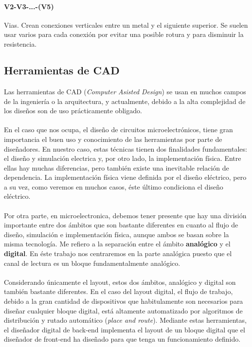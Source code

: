 \paragraph{V2-V3-...-(V5)} Vias. Crean conexiones verticales entre un metal y el
siguiente superior. Se suelen usar varios para cada conexión por evitar una
posible rotura y para disminuir la resistencia.

\subsection{Herramientas de CAD}

\paragraph{} Las herramientas de CAD (\textit{Computer Asisted Design}) se usan
en muchos campos de la ingeniería o la arquitectura, y actualmente, debido a la alta
complejidad de los diseños son de uso prácticamente obligado.

\paragraph{} En el caso que nos ocupa, el diseño de circuitos microelectrónicos,
tiene gran importancia el buen uso y conocimiento de las herramientas por parte de
diseñadores. En nuestro caso, estas técnicas tienen dos finalidades fundamentales:
el diseño y simulación electrica y, por otro lado, la implementación física. Entre ellas
hay muchas diferencias, pero también existe una inevitable relación de dependencia.
La implementación física viene definida por el diseño eléctrico, pero a su vez, como
veremos en muchos casos, éste último condiciona el diseño eléctrico.

\paragraph{} Por otra parte, en microelectronica, debemos tener presente que
hay una división importante entre dos ámbitos que son bastante diferentes en cuanto
al flujo de diseño, simulación e implementación física, aunque ambos se basan sobre
la misma tecnología. Me refiero a la separación entre el ámbito \textbf{analógico}
y el \textbf{digital}. En éste trabajo nos centraremos en la parte analógica
puesto que el canal de lectura es un bloque fundamentalmente analógico.

\paragraph{} Considerando únicamente el layout, estos dos ámbitos, analógico y
digital son también bastante diferentes. En el caso del layout digital, el flujo
de trabajo, debido a la gran cantidad de dispositivos que habitulamente son necesarios
para diseñar cualquier bloque digital, está altamente automatizado por algoritmos
de distribución y rutado automático (\textit{place and route}). Mediante estas
herramientas, el diseñador digital de back-end implementa el layout de un bloque
digital que el diseñador de front-end ha diseñado para que tenga un funcionamiento
definido.

